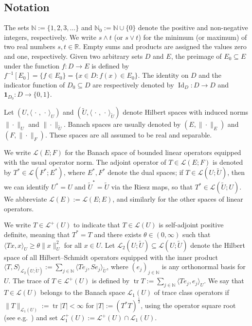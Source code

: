 \documentclass[reqno]{amsart}
\numberwithin{equation}{section}
\newcommand{\R}{\mathbb{R}}
\newcommand{\N}{\mathbb{N}}
\newcommand{\norm}[2]{     \| #1       \|_{ #2 }}
\newcommand{\scalar}[2]{     \langle #1       \rangle_{ #2 }}
\newcommand{\tr}{\operatorname{tr}}
\newcommand{\from}{\colon}
\newcommand{\id}{\operatorname{Id}}
\newcommand{\dual}[1]{#1^*}
\newcommand{\LO}{\mathscr L}
\theoremstyle{remark}
\theoremstyle{definition}
\begin{document}
\subsection{Notation} \label{subsec:prelims:Notation}

The sets $\N := \{1,2,3,\dots\}$ and $\N_0 := \N \cup \{0\}$ 
denote the positive and non-negative integers, 
respectively.
We write $s\wedge t$ (or $s \vee t$) for the 
minimum (or maximum)  
of two real numbers $s,t\in\R$. 
Empty sums and products are assigned the values zero and one, respectively.
Given two arbitrary sets $D$ and $E$, 
the preimage of $E_0 \subseteq E$ under the function $f \from D \to E$ is defined by
${f^{-1}[E_0]  = \{ f \in E_0 \} = \{x \in D: f(x)\in E_0\}}$.
The identity on $D$ and the indicator function of $D_0 \subseteq D$
are respectively denoted by $\id_D \from D \to D$ and
$\mathbf 1_{D_0} \from D \to \{0,1\}$.

Let
$(U, \scalar{\, \cdot \, , \, \cdot \,}{U})$ and 
$(\widetilde U, \scalar{\, \cdot \, , \, \cdot \,}{\widetilde U})$ denote Hilbert spaces
with induced norms ${\norm{\cdot}{U}}$ and $\norm{\cdot}{\widetilde U}$.
Banach spaces are usually denoted by
$(E, \norm{\cdot}{E})$ and $(F, \norm{\cdot}{F})$. These
spaces are all assumed to be real and separable.

We write ${\mathscr L(E;F)}$ 
for the Banach space of bounded linear operators equipped with the usual operator norm.
The adjoint operator of $T\in \mathscr L(E;F)$ 
is denoted by ${\dual T \in \mathscr L(\dual F; \dual E)}$, where $E^*, F^*$ denote the dual spaces; 
if $T \in \LO({U}; \widetilde U)$, then
we can identify $\dual U = U$ 
and $\dual {\widetilde{U}} = \widetilde{U}$ via the Riesz 
maps, so that  
$\dual T\in \mathscr L(\widetilde U; {U})$.
We 
abbreviate 
$\mathscr L(E) := \mathscr L(E;E)$, 
and similarly for the other spaces of linear operators. 

We write $T \in \mathscr L^+(U)$
to indicate that $T \in \LO(U)$ is self-adjoint 
positive definite, meaning that $\dual T = T$ and
there exists $\theta\in(0,\infty)$ such that 
$\scalar{Tx,x}{U} \geq \theta \|x\|_U^2$ 
for all $x\in U$.
Let
$\mathscr L_2(U; \widetilde U) \subseteq \mathscr L(U; \widetilde U)$
denote the Hilbert space of all Hilbert--Schmidt operators
equipped with
the inner product 
$\langle T,S \rangle_{\mathscr L_2(U; \widetilde U)} := \sum_{j \in \N} \langle Te_j, Se_j \rangle_{\widetilde U}$, 
where
$(e_j)_{j\in\N}$ is any orthonormal basis for~$U$.  
The trace of $T \in \LO^+(U)$ is defined by
%
$
\tr T := \sum_{j \in \N} \scalar{Te_j, e_j}{U}.
$
%
We say that $T \in \LO(U)$ 
belongs to the Banach space $\mathscr L_1(U)$ of trace class operators 
if $\norm{T}{\LO_1(U)} := \tr |T| < \infty$ for $|T| := (\dual T T)^{\frac{1}{2}}$,
using the operator square root 
(see e.g.~\cite[Proposition~8.27]{Neerven2022})  
and set $\LO_1^+(U) := \LO^+(U) \cap \LO_1(U)$.
\end{document}
